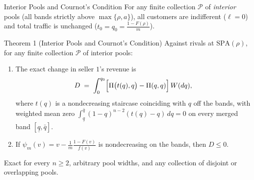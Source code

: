 \documentclass[11pt,aspectratio=169,handout]{beamer}
\newcommand{\SPA}{\mathrm{SPA}}
\newcommand{\uq}{\underline q}
\newcommand{\oq}{\bar q}
\begin{document}
\begin{frame}{Interior Pools and Cournot's Condition}
For any finite collection $\mathcal P$ of \emph{interior} pools (all bands strictly above $\max\{\rho,a\}$), all customers are indifferent ($\ell=0$) and total traffic is unchanged ($t_0=q_0=\frac{1-F(\rho)}{m}$).

\medskip
\begin{block}{Theorem 1 (Interior Pools and Cournot's Condition)}
Against rivals at $\SPA(\rho)$, for any finite collection $\mathcal P$ of interior pools:
\begin{enumerate}
\item The exact change in seller $1$'s revenue is
\[
D \;=\; \int_0^{q_0} \Bigl[\Pi\bigl(t(q),q\bigr) - \Pi(q,q)\Bigr]\,W(dq),
\]
where $t(q)$ is a nondecreasing staircase coinciding with $q$ off the bands, with weighted mean zero $\int_{\uq}^{\oq}(1-q)^{n-2}(t(q)-q)\,dq = 0$ on every merged band $[\uq,\oq]$.
\item If $\psi_m(v)=v-\frac{1}{m}\frac{1-F(v)}{f(v)}$ is nondecreasing on the bands, then $D\le 0$.
\end{enumerate}
\end{block}

Exact for every $n\ge 2$, arbitrary pool widths, and any collection of disjoint or overlapping pools.
\end{frame}
\end{document}
